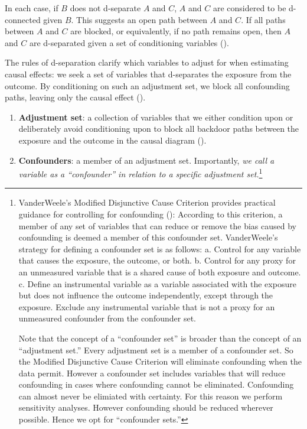 \documentclass[
  singlecolumn]{article}
\begin{document}
In each case, if \(B\) does not d-separate \(A\) and \(C\), \(A\) and
\(C\) are considered to be d-connected given \(B\). This suggests an
open path between \(A\) and \(C\). If all paths between \(A\) and \(C\)
are blocked, or equivalently, if no path remains open, then \(A\) and
\(C\) are d-separated given a set of conditioning variables
().

The rules of d-separation clarify which variables to adjust for when
estimating causal effects: we seek a set of variables that d-separates
the exposure from the outcome. By conditioning on such an adjustment
set, we block all confounding paths, leaving only the causal effect
().

\begin{enumerate}
\def\labelenumi{\arabic{enumi}.}
\setcounter{enumi}{5}
\item
  \textbf{Adjustment set}: a collection of variables that we either
  condition upon or deliberately avoid conditioning upon to block all
  backdoor paths between the exposure and the outcome in the causal
  diagram ().
\item
  \textbf{Confounders}: a member of an adjustment set. Importantly,
  \emph{we call a variable as a ``confounder'' in relation to a specific
  adjustment set.}\footnote{VanderWeele's Modified Disjunctive Cause
    Criterion provides practical guidance for controlling for
    confounding ():
    According to this criterion, a member of any set of variables that
    can reduce or remove the bias caused by confounding is deemed a
    member of this confounder set. VanderWeele's strategy for defining a
    confounder set is as follows: a. Control for any variable that
    causes the exposure, the outcome, or both. b. Control for any proxy
    for an unmeasured variable that is a shared cause of both exposure
    and outcome. c. Define an instrumental variable as a variable
    associated with the exposure but does not influence the outcome
    independently, except through the exposure. Exclude any instrumental
    variable that is not a proxy for an unmeasured confounder from the
    confounder set.

    Note that the concept of a ``confounder set'' is broader than the
    concept of an ``adjustment set.'' Every adjustment set is a member
    of a confounder set. So the Modified Disjunctive Cause Criterion
    will eliminate confounding when the data permit. However a
    confounder set includes variables that will reduce confounding in
    cases where confounding cannot be eliminated. Confounding can almost
    never be elimiated with certainty. For this reason we perform
    sensitivity analyses. However confounding should be reduced wherever
    possible. Hence we opt for ``confounder sets.''}
\end{enumerate}
\end{document}

